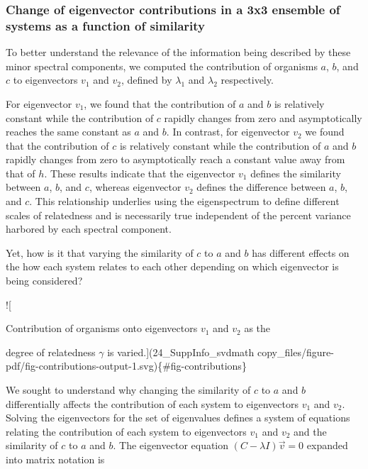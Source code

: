 \documentclass[
  letterpaper,
  DIV=11,
  numbers=noendperiod]{scrartcl}
\begin{document}
\hypertarget{change-of-eigenvector-contributions-in-a-3x3-ensemble-of-systems-as-a-function-of-similarity}{%
\subsubsection{Change of eigenvector contributions in a 3x3 ensemble of
systems as a function of
similarity}\label{change-of-eigenvector-contributions-in-a-3x3-ensemble-of-systems-as-a-function-of-similarity}}

To better understand the relevance of the information being described by
these minor spectral components, we computed the contribution of
organisms \(a\), \(b\), and \(c\) to eigenvectors \(v_1\) and \(v_2\),
defined by \(λ_1\) and \(λ_2\) respectively.

For eigenvector \(v_1\), we found that the contribution of \(a\) and
\(b\) is relatively constant while the contribution of \(c\) rapidly
changes from zero and asymptotically reaches the same constant as \(a\)
and \(b\). In contrast, for eigenvector \(v_2\) we found that the
contribution of \(c\) is relatively constant while the contribution of
\(a\) and \(b\) rapidly changes from zero to asymptotically reach a
constant value away from that of \(h\). These results indicate that the
eigenvector \(v_1\) defines the similarity between \(a\), \(b\), and
\(c\), whereas eigenvector \(v_2\) defines the difference between \(a\),
\(b\), and \(c\). This relationship underlies using the eigenspectrum to
define different scales of relatedness and is necessarily true
independent of the percent variance harbored by each spectral component.

Yet, how is it that varying the similarity of \(c\) to \(a\) and \(b\)
has different effects on the how each system relates to each other
depending on which eigenvector is being considered?

!{[}

Contribution of organisms onto eigenvectors \(v_1\) and \(v_2\) as the

degree of relatedness \(\gamma\) is varied.{]}(24\_SuppInfo\_svdmath
copy\_files/figure-pdf/fig-contributions-output-1.svg)\{\#fig-contributions\}

We sought to understand why changing the similarity of \(c\) to \(a\)
and \(b\) differentially affects the contribution of each system to
eigenvectors \(v_1\) and \(v_2\). Solving the eigenvectors for the set
of eigenvalues defines a system of equations relating the contribution
of each system to eigenvectors \(v_1\) and \(v_2\) and the similarity of
\(c\) to \(a\) and \(b\). The eigenvector equation
\((C-\lambda I)\vec{v} = 0\) expanded into matrix notation is
\end{document}
